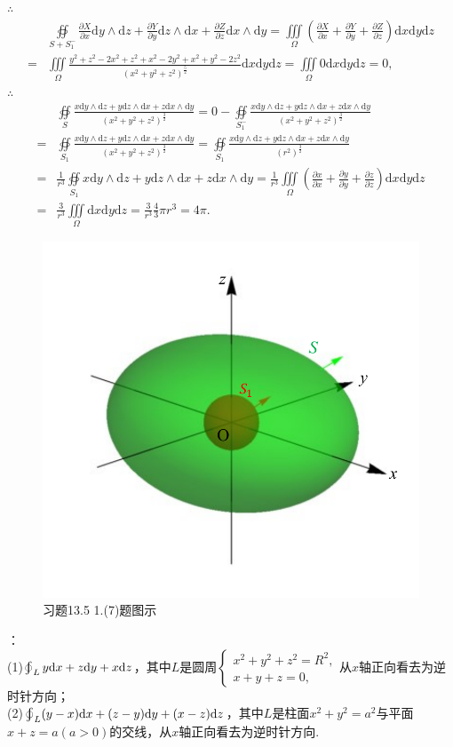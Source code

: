 \documentclass[12pt,UTF8,fleqn]{ctexart}
\newcommand{\varIIInt}[5]{\iiint\limits_{#1}#2\mathrm d#3\mathrm d#4\mathrm d#5}
\newcommand{\BLOInt}[2]{\varoint\nolimits_{#1}#2}
\newcommand{\md}[1]{\mathrm d#1}
\newcommand{\pp}[2]{\frac{\partial #1}{\partial #2}}
\newcommand{\BSOIInt}[2]{\oiint\limits_{#1}#2}
\begin{document}
\begin{enumerate}
$\therefore$
\[\begin{aligned}
&\BSOIInt{S+S_1^-}{\pp Xx\md y\wedge\md z+\pp Yy\md z\wedge\md x+\pp Zz\md x\wedge\md y}=\varIIInt\Omega{(\pp Xx+\pp Yy+\pp Zz)}xyz\\
=&\varIIInt\Omega{\frac{y^2+z^2-2x^2+z^2+x^2-2y^2+x^2+y^2-2z^2}{(x^2+y^2+z^2)^{\frac52}}}xyz=\varIIInt\Omega{0}xyz=0,
\end{aligned}\]
$\therefore$
\[\begin{aligned}
&\BSOIInt S{\frac{x\md y\wedge\md z+y\md z\wedge\md x+z\md x\wedge\md y}{(x^2+y^2+z^2)^{\frac32}}}=0-\BSOIInt{S_1^-}{\frac{x\md y\wedge\md z+y\md z\wedge\md x+z\md x\wedge\md y}{(x^2+y^2+z^2)^{\frac32}}}\\
=&\BSOIInt{S_1}{\frac{x\md y\wedge\md z+y\md z\wedge\md x+z\md x\wedge\md y}{(x^2+y^2+z^2)^{\frac32}}}=\BSOIInt{S_1}{\frac{x\md y\wedge\md z+y\md z\wedge\md x+z\md x\wedge\md y}{(r^2)^{\frac32}}}\\=&\frac1{r^3}\BSOIInt{S_1}{x\md y\wedge\md z+y\md z\wedge\md x+z\md x\wedge\md y}=\frac1{r^3}\varIIInt\Omega{(\pp xx+\pp yy+\pp zz)}xyz\\
=&\frac3{r^3}\varIIInt\Omega{}xyz=\frac3{r^3}\frac43\pi r^3=4\pi.
\end{aligned}\]
\begin{figure}[H]
\begin{center}
\includegraphics[height=0.5\textheight]{Figures24/Fig13-5-1-7.pdf}
\end{center}
\caption{习题13.5 1.(7)题图示}
\label{13-5-1-7}
\end{figure}
：\\
(1)$\BLOInt L{y\md x+z\md y+x\md z}$，其中$L$是圆周$\begin{cases}
x^2+y^2+z^2=R^2,\\
x+y+z=0,
\end{cases}$从$x$轴正向看去为逆时针方向；\\
(2)$\BLOInt L{(y-x)\md x+(z-y)\md y+(x-z)\md z}$，其中$L$是柱面$x^2+y^2=a^2$与平面$x+z=a(a>0)$的交线，从$x$轴正向看去为逆时针方向.


\end{enumerate}
\end{document}
